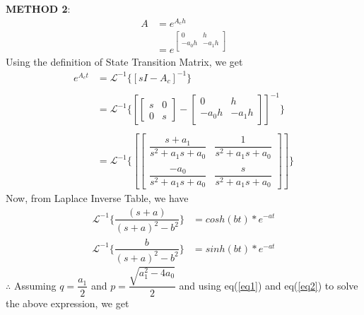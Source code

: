 \documentclass[a4paper,12pt]{article}
\begin{document}
\textbf{METHOD 2}:
\begin{align*}
A &= e^{A_c h} \\
&= e^{\begin{bmatrix}
	0 & h\\
	-a_0 h & - a_1 h\\
\end{bmatrix}}
\end{align*}
Using the definition of State Transition Matrix, we get
\begin{align*}
e^{A_c t} &=  \mathcal{L}^{-1} \{ [sI - A_c]^{-1}\} \\ \\
&= \mathcal{L}^{-1} \{[\begin{bmatrix}
s & 0 \\
0 & s
\end{bmatrix}
- \begin{bmatrix}
0 & h\\
-a_0 h & - a_1 h\\
\end{bmatrix}]^{-1}
\} \\ \\
&= \mathcal{L}^{-1} \{[\begin{bmatrix}
\dfrac{s + a_1}{s^2 + a_1 s + a_0} & \dfrac{1}{s^2 + a_1 s + a_0} \\ \\
\dfrac{-a_0}{s^2 + a_1 s + a_0} & \dfrac{s}{s^2 + a_1 s + a_0}
\end{bmatrix}] \}
\end{align*}
Now, from Laplace Inverse Table, we have 
\begin{align}
\mathcal{L}^{-1} \{\dfrac{(s+a)}{(s+a)^2- b^2} \} &= cosh(bt)*e^{-at}
\label{eq1}
\end{align}
\begin{align}
\mathcal{L}^{-1} \{\dfrac{b}{(s+a)^2- b^2} \} &= sinh(bt)*e^{-at}
\label{eq2}
\end{align}
$\therefore$ Assuming \textit{$q = \dfrac{a_1}{2}$} and \textit{$p = \dfrac{\sqrt{a_1^2 - 4a_0}}{2}$} and using eq(\ref{eq1}) and eq(\ref{eq2}) to solve the above expression, we get
\end{document}

